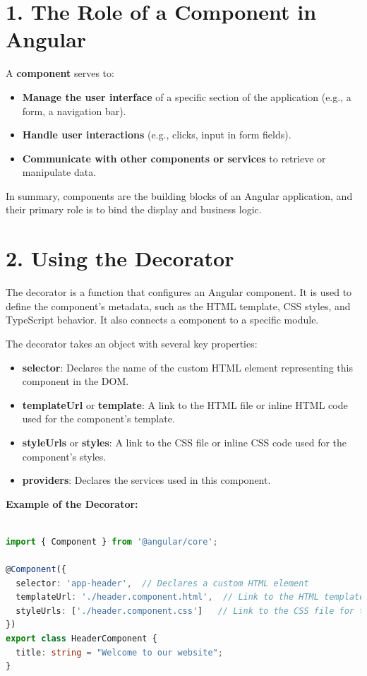 \documentclass{article}
\begin{document}
\section*{1. The Role of a Component in Angular}

A \textbf{component} serves to:
\begin{itemize}
  \item \textbf{Manage the user interface} of a specific section of the application (e.g., a form, a navigation bar).
  \item \textbf{Handle user interactions} (e.g., clicks, input in form fields).
  \item \textbf{Communicate with other components or services} to retrieve or manipulate data.
\end{itemize}

In summary, components are the building blocks of an Angular application, and their primary role is to bind the display and business logic.

\section*{2. Using the \@Component Decorator}

The \@Component decorator is a function that configures an Angular component. It is used to define the component's metadata, such as the HTML template, CSS styles, and TypeScript behavior. It also connects a component to a specific module.

The \@Component decorator takes an object with several key properties:
\begin{itemize}
  \item \textbf{selector}: Declares the name of the custom HTML element representing this component in the DOM.
  \item \textbf{templateUrl} or \textbf{template}: A link to the HTML file or inline HTML code used for the component's template.
  \item \textbf{styleUrls} or \textbf{styles}: A link to the CSS file or inline CSS code used for the component's styles.
  \item \textbf{providers}: Declares the services used in this component.
\end{itemize}

\textbf{Example of the \@Component Decorator:}
\begin{lstlisting}[language=TypeScript, caption={Using a service in a component}, label={lst:typescript-service-usage}]

import { Component } from '@angular/core';

@Component({
  selector: 'app-header',  // Declares a custom HTML element
  templateUrl: './header.component.html',  // Link to the HTML template
  styleUrls: ['./header.component.css']   // Link to the CSS file for the component
})
export class HeaderComponent {
  title: string = "Welcome to our website";
}
\end{lstlisting}
\end{document}
